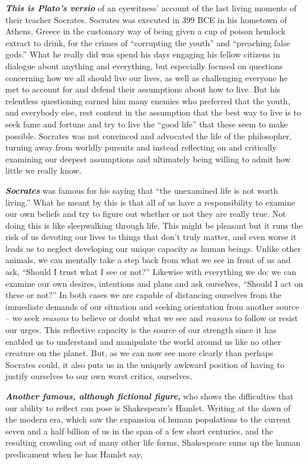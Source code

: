 \documentclass[
  12pt, openany]{book}
\begin{document}
\textbf{\emph{This is Plato's versio}} of an eyewitness' account of the last living moments of their teacher Socrates. Socrates was executed in 399 BCE in his hometown of Athens, Greece in the customary way of being given a cup of poison hemlock extract to drink, for the crimes of ``corrupting the youth'' and ``preaching false gods.'' What he really did was spend his days engaging his fellow citizens in dialogue about anything and everything, but especially focused on questions concerning how we all should live our lives, as well as challenging everyone he met to account for and defend their assumptions about how to live. But his relentless questioning earned him many enemies who preferred that the youth, and everybody else, rest content in the assumption that the best way to live is to seek fame and fortune and try to live the ``good life'' that these seem to make possible. Socrates was not convinced and advocated the life of the philosopher, turning away from worldly pursuits and instead reflecting on and critically examining our deepest assumptions and ultimately being willing to admit how little we really know.

\textbf{\emph{Socrates}} was famous for his saying that ``the unexamined life is not worth living.'' What he meant by this is that all of us have a responsibility to examine our own beliefs and try to figure out whether or not they are really true. Not doing this is like sleepwalking through life. This might be pleasant but it runs the risk of us devoting our lives to things that don't truly matter, and even worse it leads us to neglect developing our unique capacity as human beings. Unlike other animals, we can mentally take a step back from what we see in front of us and ask, ``Should I trust what I see or not?'' Likewise with everything we do: we can examine our own desires, intentions and plans and ask ourselves, ``Should I act on these or not?'' In both cases we are capable of distancing ourselves from the immediate demands of our situation and seeking orientation from another source -- we seek \emph{reasons} to believe or doubt what we see and \emph{reasons} to follow or resist our urges. This reflective capacity is the source of our strength since it has enabled us to understand and manipulate the world around us like no other creature on the planet. But, as we can now see more clearly than perhaps Socrates could, it also puts us in the uniquely awkward position of having to justify ourselves to our own worst critics, ourselves.

\textbf{\emph{Another famous, although fictional figure},} who shows the difficulties that our ability to reflect can pose is Shakespeare's Hamlet. Writing at the dawn of the modern era, which saw the expansion of human populations to the current seven and a half billion of us in the span of a few short centuries, and the resulting crowding out of many other life forms, Shakespeare sums up the human predicament when he has Hamlet say,
\end{document}
